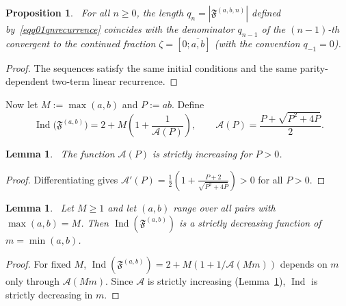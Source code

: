 \documentclass[12pt]{amsart}
\theoremstyle{plain}
\newtheorem{lemma}[theorem]{Lemma}
\newtheorem{proposition}[theorem]{Proposition}
\theoremstyle{definition}
\theoremstyle{remark}
\newcommand{\AlphA}{\mathcal{A}}
\newcommand{\FD}{\mathfrak{F}}
\begin{document}
\begin{proposition}~\label{prop001convergentidentity}
For all $n\geqslant 0$, the length $q_n=|\FD^{(a,b,n)}|$ defined
by~\eqref{eqq01qnrecurrence} coincides with the denominator $q_{n-1}$ of the $(n-1)$-th convergent to the continued fraction $\zeta=[0;\overline{a,b}]$ (with the convention $q_{-1}=0$).
\end{proposition}
\begin{proof}
The sequences satisfy the same initial conditions and the same parity-dependent two-term linear recurrence.
\end{proof}

Now let $M:=\max(a,b)$ and $P:=ab$. Define
\begin{equation}~\label{eqq01indMP}
  \operatorname{Ind}\bigl(\FD^{(a,b)}\bigr) = 2+M\left(1+\frac1{\AlphA (P)}\right),
  \qquad   \AlphA (P)=\frac{P+\sqrt{P^2+4P}}{2}.
\end{equation}

\begin{lemma}~\label{lem01alphamonotone}
The function $\AlphA (P)$ is strictly increasing for $P>0$.
\end{lemma}
\begin{proof}
Differentiating gives $\AlphA '(P) = \frac12\left(1+\frac{P+2}{\sqrt{P^2+4P}}\right) >0$
for all $P>0$.
\end{proof}

\begin{lemma}~\label{lem01lockstructure}
Let $M\geqslant 1$ and let $(a,b)$ range over all pairs with $\max(a,b)=M$. Then
$\operatorname{Ind}(\FD^{(a,b)})$ is a strictly decreasing function of $m=\min(a,b)$.
\end{lemma}
\begin{proof}
For fixed $M$, $\operatorname{Ind}(\FD^{(a,b)})=2+M(1+1/\AlphA (Mm))$ depends on $m$ only through $\AlphA (Mm)$. Since $\AlphA $ is strictly increasing (Lemma~\ref{lem01alphamonotone}), $\operatorname{Ind}$ is strictly decreasing in $m$.
\end{proof}
\end{document}
